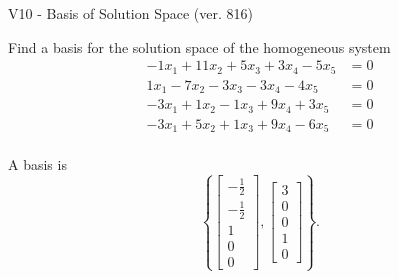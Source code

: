\begin{exercise}
  \begin{exerciseTitle}V10 - Basis of Solution Space (ver. 816)\end{exerciseTitle}
  \begin{exerciseStatement}
    Find a basis for the solution space of the homogeneous system 
\begin{align*}
 -1 x_ 1 + 11 x_ 2 + 5 x_ 3 + 3 x_ 4 -5 x_ 5 &= 0  \\ 
  1 x_ 1 -7 x_ 2 -3 x_ 3 -3 x_ 4 -4 x_ 5 &= 0  \\ 
  -3 x_ 1 + 1 x_ 2 -1 x_ 3 + 9 x_ 4 + 3 x_ 5 &= 0  \\ 
  -3 x_ 1 + 5 x_ 2 + 1 x_ 3 + 9 x_ 4 -6 x_ 5 &= 0  \\ 
 \end{align*}


 
  \end{exerciseStatement}

  \begin{exerciseAnswer}
   A basis is   
\[\left\{\left[\begin{array}{c}
-\frac{1}{2} \\
-\frac{1}{2} \\
1 \\
0 \\
0
\end{array}\right] , \left[\begin{array}{c}
3 \\
0 \\
0 \\
1 \\
0
\end{array}\right]\right\}.\]

  


  \end{exerciseAnswer}
\end{exercise}